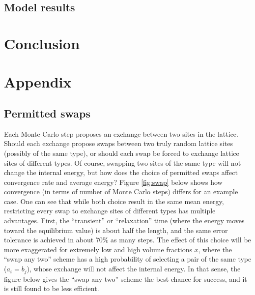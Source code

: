 \documentclass[10pt]{article}
\begin{document}
\subsection{Model results}

\section{Conclusion}




\clearpage
\section{Appendix}
\subsection{Permitted swaps}
Each Monte Carlo step proposes an exchange between two sites in the lattice.
Should each exchange propose swaps between two truly random lattice sites (possibly of the same type), or should each swap be forced to exchange lattice sites of different types.
Of course, swapping two sites of the same type will not change the internal energy, but how does the choice of permitted swaps affect convergence rate and average energy?
Figure \ref{fig:swap} below shows how convergence (in terms of number of Monte Carlo steps) differs for an example case.
One can see that while both choice result in the same mean energy, restricting every swap to exchange sites of different types has multiple advantages.
First, the ``transient'' or ``relaxation'' time (where the energy moves toward the equilibrium value) is about half the length, and the same error tolerance is achieved in about 70\% as many steps.
The effect of this choice will be more exaggerated for extremely low and  high volume fractions $x$, where the ``swap any two'' scheme has a high probability of selecting a pair of the same type ($a_i = b_j$), whose exchange will not affect the internal energy.
In that sense, the figure below gives the ``swap any two'' scheme the best chance for success, and it is still found to be less efficient.
\end{document}
